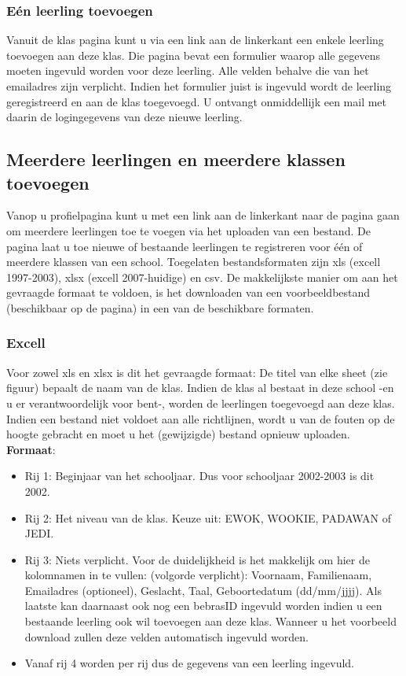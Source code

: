 \documentclass[11pt,a4paper]{report}
\begin{document}
\subsubsection{E\'{e}n leerling toevoegen}
Vanuit de klas pagina kunt u via een link aan de linkerkant een enkele leerling toevoegen aan deze klas. Die pagina bevat een formulier waarop alle gegevens moeten ingevuld worden voor deze leerling. Alle velden behalve die van het emailadres zijn verplicht. Indien het formulier juist is ingevuld wordt de leerling geregistreerd en aan de klas toegevoegd. U ontvangt onmiddellijk een mail met daarin de logingegevens van deze nieuwe leerling. 

\subsection{Meerdere leerlingen en meerdere klassen toevoegen}
Vanop u profielpagina kunt u met een link aan de linkerkant naar de pagina gaan om meerdere leerlingen toe te voegen via het uploaden van een bestand. De pagina laat u toe nieuwe of bestaande leerlingen te registreren voor \'e\'en of meerdere klassen van een school. Toegelaten bestandsformaten zijn xls (excell 1997-2003), xlsx (excell 2007-huidige) en csv. De makkelijkste manier om aan het gevraagde formaat te voldoen, is het downloaden van een voorbeeldbestand (beschikbaar op de pagina) in een van de beschikbare formaten.
\subsubsection{Excell}
Voor zowel xls en xlsx is dit het gevraagde formaat:
De titel van elke sheet (zie figuur) bepaalt de naam van de klas. Indien de klas al bestaat in deze school -en u er verantwoordelijk voor bent-, worden de leerlingen toegevoegd aan deze klas. Indien een bestand niet voldoet aan alle richtlijnen, wordt u van de fouten op de hoogte gebracht en moet u het (gewijzigde) bestand opnieuw uploaden.
\\ \textbf{Formaat}:
\begin{itemize}
\item Rij 1: Beginjaar van het schooljaar. Dus voor schooljaar 2002-2003 is dit 2002.
\item Rij 2: Het niveau van de klas. Keuze uit: EWOK, WOOKIE, PADAWAN of JEDI.
\item Rij 3: Niets verplicht. Voor de duidelijkheid is het makkelijk om hier de kolomnamen in te vullen: (volgorde verplicht): Voornaam, Familienaam, Emailadres (optioneel), Geslacht, Taal, Geboortedatum (dd/mm/jjjj). Als laatste kan daarnaast ook nog een bebrasID ingevuld worden indien u een bestaande leerling ook wil toevoegen aan deze klas. Wanneer u het voorbeeld download zullen deze velden automatisch ingevuld worden.
\item Vanaf rij 4 worden per rij dus de gegevens van een leerling ingevuld.
\end{itemize}
\end{document}
